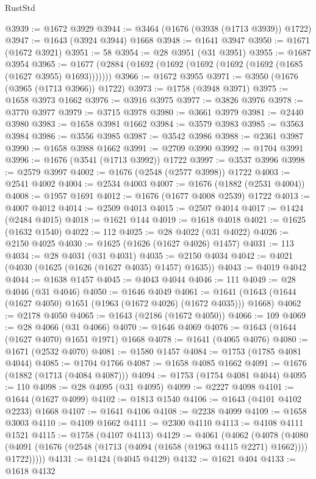 \begin{lexlean}{RustStd}
\begin{coremodule}
@3939 := @1672 @3929
@3944 := @3464 (@1676 (@3938 (@1713 @3939)) @1722)
@3947 := @1643 (@3924 @3944) @1668
@3948 := @1641 @3947
@3950 := @1671 (@1672 @3921)
@3951 := 58
@3954 := @28 @3951 (@31 @3951)
@3955 := @1687 @3954
@3965 := @1677 (@2884 (@1692 (@1692 (@1692 (@1692 (@1692 (@1685 (@1627 @3955) @1693)))))))
@3966 := @1672 @3955
@3971 := @3950 (@1676 (@3965 (@1713 @3966)) @1722)
@3973 := @1758 (@3948 @3971)
@3975 := @1658 @3973 @1662
@3976 := @3916 @3975
@3977 := @3826 @3976
@3978 := @3770 @3977
@3979 := @3715 @3978
@3980 := @3661 @3979
@3981 := @2440 @3980
@3983 := @1658 @3981 @1662
@3984 := @3579 @3983
@3985 := @3563 @3984
@3986 := @3556 @3985
@3987 := @3542 @3986
@3988 := @2361 @3987
@3990 := @1658 @3988 @1662
@3991 := @2709 @3990
@3992 := @1704 @3991
@3996 := @1676 (@3541 (@1713 @3992)) @1722
@3997 := @3537 @3996
@3998 := @2579 @3997
@4002 := @1676 (@2548 (@2577 @3998)) @1722
@4003 := @2541 @4002
@4004 := @2534 @4003
@4007 := @1676 (@1882 (@2531 @4004))
@4008 := @1957 @1691
@4012 := @1676 (@1677 @4008 @2539) @1722
@4013 := @4007 @4012
@4014 := @2509 @4013
@4015 := @2507 @4014
@4017 := @1424 (@2484 @4015)
@4018 := @1621 @144
@4019 := @1618 @4018
@4021 := @1625 (@1632 @1540)
@4022 := 112
@4025 := @28 @4022 (@31 @4022)
@4026 := @2150 @4025
@4030 := @1625 (@1626 (@1627 @4026) @1457)
@4031 := 113
@4034 := @28 @4031 (@31 @4031)
@4035 := @2150 @4034
@4042 := @4021 (@4030 (@1625 (@1626 (@1627 @4035) @1457) @1635))
@4043 := @4019 @4042
@4044 := @1638 @1457
@4045 := @4043 @4044
@4046 := 111
@4049 := @28 @4046 (@31 @4046)
@4050 := @1646 @4049
@4061 := @1641 (@1643 (@1644 (@1627 @4050) @1651 (@1963 (@1672 @4026) (@1672 @4035))) @1668)
@4062 := @2178 @4050
@4065 := @1643 (@2186 (@1672 @4050))
@4066 := 109
@4069 := @28 @4066 (@31 @4066)
@4070 := @1646 @4069
@4076 := @1643 (@1644 (@1627 @4070) @1651 @1971) @1668
@4078 := @1641 (@4065 @4076)
@4080 := @1671 (@2532 @4070)
@4081 := @1580 @1457
@4084 := @1753 (@1785 @4081 @4044)
@4085 := @1704 @1766
@4087 := @1658 @4085 @1662
@4091 := @1676 (@1882 (@1713 (@4084 @4087)))
@4094 := @1753 (@1754 @4081 @4044)
@4095 := 110
@4098 := @28 @4095 (@31 @4095)
@4099 := @2227 @4098
@4101 := @1644 (@1627 @4099)
@4102 := @1813 @1540
@4106 := @1643 (@4101 @4102 @2233) @1668
@4107 := @1641 @4106
@4108 := @2238 @4099
@4109 := @1658 @3003
@4110 := @4109 @1662
@4111 := @2300 @4110
@4113 := @4108 @4111 @1521
@4115 := @1758 (@4107 @4113)
@4129 := @4061
    (@4062
      (@4078
        (@4080 (@4091 (@1676 (@2548 (@1713 (@4094 (@1658 (@1963 @4115 @2271) @1662)))) @1722)))))
@4131 := @1424 (@4045 @4129)
@4132 := @1621 @404
@4133 := @1618 @4132

\end{coremodule}
\end{lexlean}
